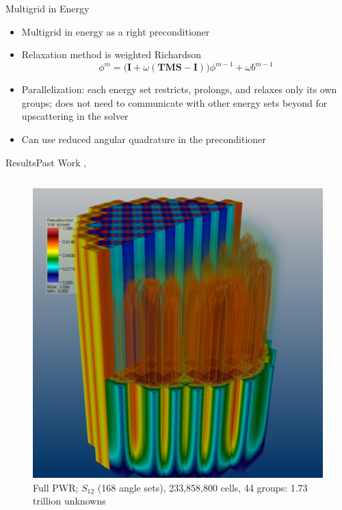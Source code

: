 \documentclass[final]{beamer}
\newcommand{\ve}[1]{\ensuremath{\mathbf{#1}}}
\begin{document}
\begin{frame}{}
\begin{columns}[t]
\begin{column}{.3\linewidth}
\begin{block}{\large Multigrid in Energy \cite{Slaybaugh2013}}
        \begin{itemize}
			\item{Multigrid in energy as a right preconditioner}
			\item{Relaxation method is weighted Richardson}
			\begin{equation}
              \phi^{m} = \bigr(\ve{I} + \omega(\ve{TMS} - \ve{I})\bigl)\phi^{m-1}
               + \omega b^{m-1}
            \label{eq:relax}
            \end{equation} 
			\item{Parallelization: each energy set restricts, prolongs, and relaxes only
			 its own groups; does not need to communicate with other energy sets
			 beyond for upscattering in the solver}
			\item{Can use reduced angular quadrature in the preconditioner}
			\end{itemize}
        	\end{block}
			\vfill
		\begin{block}{\large Results\textemdash Past Work 
		              \cite{Slaybaugh2012}, \cite{Slaybaugh2013}}
\begin{columns}
	\begin{figure}[h!]
	\includegraphics[width=5in]{../figs/denovo-pwr.png}
	\caption{\footnotesize Full PWR; $S_{12}$ (168 angle sets), 233,858,800 
	         cells, 44 groups: 1.73 trillion unknowns}

\end{figure}
\end{columns}
\end{block}
\end{column}
\end{columns}
\end{frame}
\end{document}
